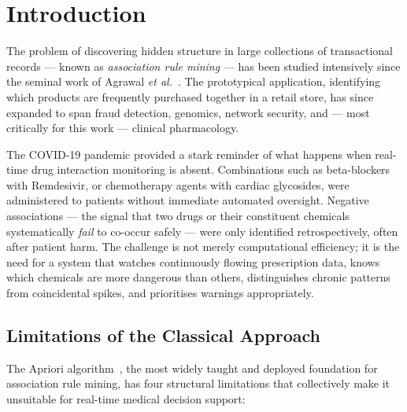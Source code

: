 \documentclass[10pt,twocolumn]{article}
\theoremstyle{plain}
\theoremstyle{definition}
\theoremstyle{remark}
\newcommand{\etal}{\textit{et al.}\xspace}
\begin{document}
\section{Introduction}
\label{sec:intro}

The problem of discovering hidden structure in large collections of
transactional records — known as \emph{association rule mining} — has
been studied intensively since the seminal work of Agrawal
\etal~\cite{agrawal1993,agrawal1994}.
The prototypical application, identifying which products are frequently
purchased together in a retail store, has since expanded to span
fraud detection, genomics, network security, and — most critically for
this work — clinical pharmacology.

The COVID-19 pandemic provided a stark reminder of what happens when
real-time drug interaction monitoring is absent.
Combinations such as beta-blockers with Remdesivir, or chemotherapy
agents with cardiac glycosides, were administered to patients without
immediate automated oversight.
Negative associations — the signal that two drugs or their constituent
chemicals systematically \emph{fail} to co-occur safely — were only
identified retrospectively, often after patient harm.
The challenge is not merely computational efficiency; it is the need
for a system that watches continuously flowing prescription data,
knows which chemicals are more dangerous than others, distinguishes
chronic patterns from coincidental spikes, and prioritises warnings
appropriately.

\subsection{Limitations of the Classical Approach}
\label{subsec:limitations}

The Apriori algorithm~\cite{agrawal1994}, the most widely taught and
deployed foundation for association rule mining, has four structural
limitations that collectively make it unsuitable for real-time medical
decision support:
\end{document}
